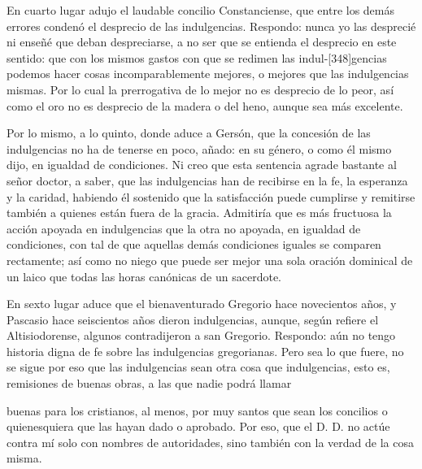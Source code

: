 En cuarto lugar adujo el laudable concilio Constanciense, que entre los demás errores condenó el desprecio de las indulgencias. Respondo: nunca yo las desprecié ni enseñé que deban despreciarse, a no ser que se entienda el desprecio en este sentido: que con los mismos gastos con que se redimen las indul-[348]gencias podemos hacer cosas incomparablemente mejores, o mejores que las indulgencias mismas. Por lo cual la prerrogativa de lo mejor no es desprecio de lo peor, así como el oro no es desprecio de la madera o del heno, aunque sea más excelente.

Por lo mismo, a lo quinto, donde aduce a Gersón, que la concesión de las indulgencias no ha de tenerse en poco, añado: en su género, o como él mismo dijo, en igualdad de condiciones. Ni creo que esta sentencia agrade bastante al señor doctor, a saber, que las indulgencias han de recibirse en la fe, la esperanza y la caridad, habiendo él sostenido que la satisfacción puede cumplirse y remitirse también a quienes están fuera de la gracia. Admitiría que es más fructuosa la acción apoyada en indulgencias que la otra no apoyada, en igualdad de condiciones, con tal de que aquellas demás condiciones iguales se comparen rectamente; así como no niego que puede ser mejor una sola oración dominical de un laico que todas las horas canónicas de un sacerdote.

En sexto lugar aduce que el bienaventurado Gregorio hace novecientos años, y Pascasio hace seiscientos años dieron indulgencias, aunque, según refiere el Altisiodorense, algunos contradijeron a san Gregorio. Respondo: aún no tengo historia digna de fe sobre las indulgencias gregorianas. Pero sea lo que fuere, no se sigue por eso que las indulgencias sean otra cosa que indulgencias, esto es, remisiones de buenas obras, a las que nadie podrá llamar

buenas para los cristianos, al menos, por muy santos que sean los concilios o quienesquiera que las hayan dado o aprobado. Por eso, que el D. D. no actúe contra mí solo con nombres de autoridades, sino también con la verdad de la cosa misma.

